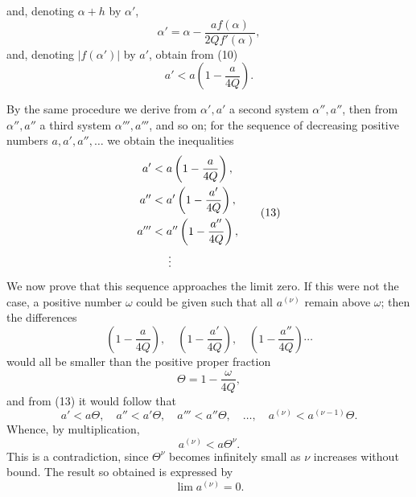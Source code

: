 
and, denoting $\alpha+h$ by $\alpha'$,
\begin{equation}
 \alpha'=\alpha-\frac{a f(\alpha)}{2Q f'(\alpha)},
\tag{11}
\end{equation}
and, denoting $|f(\alpha')|$ by $a'$, obtain from (10)
\begin{equation}
 a'<a\left(1-\frac{a}{4Q}\right).
\tag{12}
\end{equation}

By the same procedure we derive from $\alpha',a'$ a second system $\alpha'',a''$, then from $\alpha'',a''$ a third system $\alpha''',a'''$, and so on; for the sequence of decreasing positive numbers $a,a',a'',\ldots$ we obtain the inequalities
\begin{equation}
\begin{aligned}
 a'&<a\left(1-\frac{a}{4Q}\right),\\
 a''&<a'\left(1-\frac{a'}{4Q}\right),\\
 a'''&<a''\left(1-\frac{a''}{4Q}\right),\\
 &\hspace{1.5em}\vdots
\end{aligned}
\tag{13}
\end{equation}
We now prove that this sequence approaches the limit zero. If this were not the case, a positive number $\omega$ could be given such that all $a^{(\nu)}$ remain above $\omega$; then the differences
\[
 \left(1-\frac{a}{4Q}\right),\quad
 \left(1-\frac{a'}{4Q}\right),\quad
 \left(1-\frac{a''}{4Q}\right)\cdots
\]
would all be smaller than the positive proper fraction
\[
 \Theta=1-\frac{\omega}{4Q},
\]
and from (13) it would follow that
\[
 a'<a\Theta,\quad
 a''<a'\Theta,\quad
 a'''<a''\Theta,\quad
 \ldots,\quad
 a^{(\nu)}<a^{(\nu-1)}\Theta.
\]
Whence, by multiplication,
\begin{equation}
 a^{(\nu)}<a\Theta^\nu.
\tag{14}
\end{equation}
This is a contradiction, since $\Theta^\nu$ becomes infinitely small as $\nu$ increases without bound. The result so obtained is expressed by
\begin{equation}
 \lim a^{(\nu)}=0.
\tag{15}
\end{equation}
